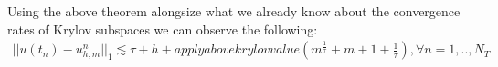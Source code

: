 \begin{corollary}
    Using the above theorem alongsize what we already know about the convergence rates of Krylov subspaces we can observe the following:
    \begin{align*}
        ||u(t_n) - u_{h,m}^n||_1 \lesssim \tau + h + apply above krylov value(m^\frac{1}{\tau} + m + 1 + \frac{1}{\tau}), \forall n = 1,..,N_T
    \end{align*}
\end{corollary}